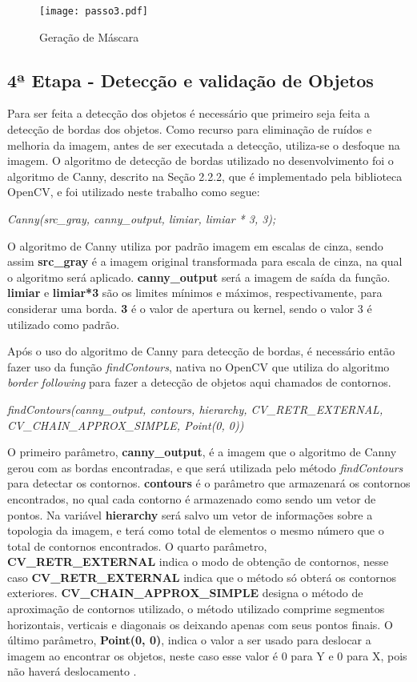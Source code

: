 \begin{figure}[H]
			\centering
			\texttt{[image: passo3.pdf]}
			\caption{Geração de Máscara}
			\label{Configuracao}
		\end{figure}		


\subsection{4ª Etapa - Detecção e validação de Objetos}
Para ser feita a detecção dos objetos é necessário que primeiro seja feita a detecção de bordas dos objetos. Como recurso para eliminação de ruídos e melhoria da imagem, antes de ser executada a detecção, utiliza-se o desfoque na imagem. O algoritmo de detecção de bordas utilizado no desenvolvimento foi o algoritmo de Canny, descrito na Seção 2.2.2, que é implementado pela biblioteca OpenCV, e foi utilizado neste trabalho como segue:
\begin{center}
\centering \textit{  Canny(src\_gray, canny\_output, limiar, limiar * 3, 3);}
\end{center}

O algoritmo de Canny utiliza por padrão imagem em escalas de cinza, sendo assim \textbf{src\_gray} é a imagem original transformada para escala de cinza, na qual o algoritmo será aplicado. \textbf{canny\_output} será a imagem de saída da função.
\textbf{limiar} e \textbf{limiar*3} são os limites mínimos e máximos, respectivamente, para considerar uma borda. \textbf{3} é o valor de apertura ou kernel, sendo o valor 3 é utilizado como padrão.

Após o uso do algoritmo de Canny para detecção de bordas, é necessário então fazer uso da função \textit{findContours}, nativa no OpenCV que utiliza do algoritmo {\it border following} para fazer a detecção de objetos aqui chamados de contornos.
\begin{center}
\centering \textit{ findContours(canny\_output, contours, hierarchy, CV\_RETR\_EXTERNAL, CV\_CHAIN\_APPROX\_SIMPLE, Point(0, 0))}
\end{center}

O primeiro parâmetro, \textbf{canny\_output}, é a imagem que o algoritmo de Canny gerou com as bordas encontradas, e que será utilizada pelo método \textit{findContours} para detectar os contornos. \textbf{contours} é o parâmetro que armazenará os contornos encontrados, no qual cada contorno é armazenado como sendo um vetor de pontos. Na variável \textbf{hierarchy} será salvo um vetor de informações sobre a topologia da imagem, e terá como total de elementos o mesmo número que o total de contornos encontrados. O quarto parâmetro, \textbf{CV\_RETR\_EXTERNAL} indica o modo de obtenção de contornos, nesse caso \textbf{CV\_RETR\_EXTERNAL} indica que o método só obterá os contornos exteriores. \textbf{CV\_CHAIN\_APPROX\_SIMPLE} designa o método de aproximação de contornos utilizado, o método utilizado comprime segmentos horizontais, verticais e diagonais os deixando apenas com seus pontos finais. O último parâmetro, \textbf{Point(0, 0)}, indica o valor a ser usado para deslocar a imagem ao encontrar os objetos, neste caso esse valor é 0 para Y e 0 para X, pois não haverá deslocamento \cite{OpenCV}. 

